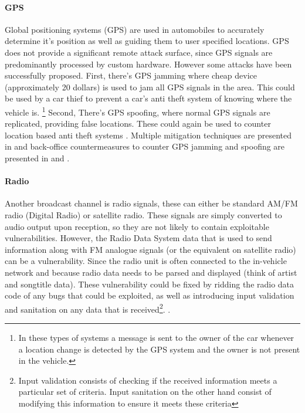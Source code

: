 \documentclass[11pt]{article}
\begin{document}
\paragraph{GPS} Global positioning systems (GPS) are used in automobiles to accurately determine it's position as well as guiding them to user specified locations. GPS does not provide a significant remote attack surface, since GPS signals are predominantly processed by custom hardware\cite{Kosher}. However some attacks have been successfully proposed. First, there's GPS jamming where cheap device (approximately 20 dollars) is used to jam all GPS signals in the area. This could be used by a car thief to prevent a car's anti theft system of knowing where the vehicle is. \footnote{In these types  of systems a message is sent to the owner of the car whenever a location change is detected by the GPS system and the owner is not present in the vehicle.} Second, There's GPS spoofing, where normal GPS signals are replicated, providing false locations. These could again be used to counter location based anti theft systems \cite{Petit}. Multiple mitigation techniques are presented in \cite{GPS1} and back-office countermeasures to counter GPS jamming and spoofing are presented in \cite{GPS2} and \cite{GPS3}. 

\paragraph{Radio} Another broadcast channel is radio signals, these can either be standard AM/FM radio (Digital Radio) or satellite radio. These signals are simply converted to audio output upon reception, so they are not likely to contain exploitable vulnerabilities. However, the Radio Data System data that is used to send information along with FM analogue signals (or the equivalent on satellite radio) can be a vulnerability. Since the radio unit is often connected to the in-vehicle network and because radio data needs to be parsed and displayed (think of artist and songtitle data). These vulnerability could be fixed by ridding the radio data code of any bugs that could be exploited, as well as introducing input validation and sanitation on any data that is received\footnote{Input validation consists of checking if the received information meets a particular set of criteria. Input sanitation on the other hand consist of modifying this information to ensure it meets these criteria}. \cite{MillerA}\cite{MillerD}\cite{Kosher}. 
\end{document}
